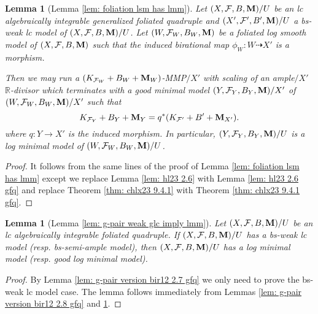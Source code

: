 \documentclass[11pt]{amsart}
\numberwithin{equation}{section}
\newcommand{\Mm}{{\bf{M}}}
\newcommand{\Rr}{\mathbb{R}}
\newcommand{\Ff}{\mathcal{F}}
\newtheorem{lem}[thm]{Lemma}
\theoremstyle{definition}
\theoremstyle{definition}
\theoremstyle{definition}
\begin{document}
\begin{lem}[Lemma \ref{lem: foliation lsm has lmm}]\label{lem: foliation lsm has lmm gfq}
Let $(X,\Ff,B,\Mm)/U$ be an lc algebraically integrable generalized foliated quadruple and $(X',\Ff',B',\Mm)/U$ a bs-weak lc model of $(X,\Ff,B,\Mm)/U$. Let $(W,\Ff_W,B_W,\Mm)$ be a foliated log smooth model of $(X,\Ff,B,\Mm)$ such that the induced birational map $\phi_W: W\dashrightarrow X'$ is a morphism. 

Then we may run a $(K_{\Ff_W}+B_W+\Mm_W)$-MMP$/X'$ with scaling of an ample$/X'$ $\Rr$-divisor which terminates with a good minimal model $(Y,\Ff_Y,B_Y,\Mm)/X'$ of $(W,\Ff_W,B_W,\Mm)/X'$ such that $$K_{\Ff_Y}+B_Y+\Mm_Y=q^*(K_{\Ff'}+B'+\Mm_{X'}).$$
where $q: Y\rightarrow X'$ is the induced morphism. In particular, $(Y,\Ff_Y,B_Y,\Mm)/U$ is a log minimal model of $(W,\Ff_W,B_W,\Mm)/U$.
\end{lem}
\begin{proof}
    It follows from the same lines of the proof of Lemma \ref{lem: foliation lsm has lmm} except we replace Lemma \ref{lem: hl23 2.6} with  Lemma \ref{lem: hl23 2.6 gfq} and replace Theorem \ref{thm: chlx23 9.4.1} with Theorem \ref{thm: chlx23 9.4.1 gfq}.
\end{proof}

\begin{lem}[Lemma \ref{lem: g-pair weak glc imply lmm}]\label{lem: g-pair weak glc imply lmm gfq}
Let $(X,\Ff,B,\Mm)/U$ be an lc algebraically integrable foliated quadruple. If $(X,\Ff,B,\Mm)/U$ has a bs-weak lc model (resp. bs-semi-ample model), then $(X,\Ff,B,\Mm)/U$ has a log minimal model (resp. good log minimal model).
\end{lem}
\begin{proof}
By Lemma \ref{lem: g-pair version bir12 2.7 gfq} we only need to prove the bs-weak lc model case. The lemma follows immediately from Lemmas \ref{lem: g-pair version bir12 2.8 gfq} and \ref{lem: foliation lsm has lmm gfq}.
\end{proof}
\end{document}
